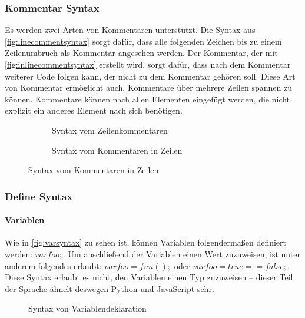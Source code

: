     \subsubsection{Kommentar Syntax}
    \label{sssec:Kommentar Syntax}
      Es werden zwei Arten von Kommentaren unterstützt. Die Syntax aus \autoref{fig:linecommentsyntax} sorgt dafür, dass alle folgenden Zeichen bis zu einem Zeilenumbruch als Kommentar angesehen werden. Der Kommentar, der mit \autoref{fig:inlinecommentsyntax} erstellt wird, sorgt dafür, dass nach dem Kommentar weiterer Code folgen kann, der nicht zu dem Kommentar gehören soll. Diese Art von Kommentar ermöglicht auch, Kommentare über mehrere Zeilen spannen zu können. Kommentare können nach allen Elementen eingefügt werden, die nicht explizit ein anderes Element nach sich benötigen.
      \begin{figure}[H]
        \vspace*{-\baselineskip}
        \centering
        \begin{minipage}{.45\linewidth}
          \begin{figure}[H]
            \centering
            \caption{Syntax vom Zeilenkommentaren}
            \label{fig:linecommentsyntax}
          \end{figure}
        \end{minipage}%
        \begin{minipage}{.45\linewidth}
          \begin{figure}[H]
            \centering
            \caption{Syntax vom Kommentaren in Zeilen}
            \label{fig:inlinecommentsyntax}
          \end{figure}
        \end{minipage}
      \end{figure}


    \subsubsection{Define Syntax}
    \label{sssec:Define Syntax}
      \paragraph{Variablen}
        Wie in \autoref{fig:varsyntax} zu sehen ist, können Variablen folgendermaßen definiert werden: \myMIn$var foo;$. Um anschließend der Variablen einen Wert zuzuweisen, ist unter anderem folgendes erlaubt: \myMIn$var foo = fun();$ oder \myMIn$var foo = true == false;$. Diese Syntax erlaubt es nicht, den Variablen einen Typ zuzuweisen -- dieser Teil der Sprache ähnelt deswegen Python und JavaScript sehr.
        \begin{figure}[H]
          \centering
          \caption{Syntax von Variablendeklaration}
          \label{fig:varsyntax}
        \end{figure}

